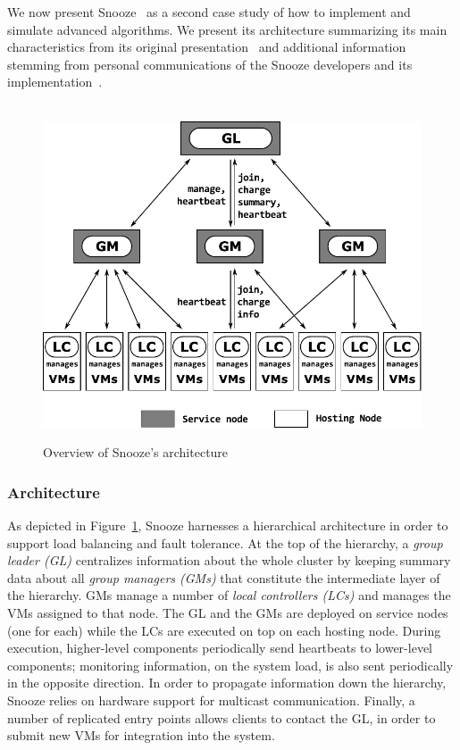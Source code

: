 We now present Snooze~\cite{feller:ccgrid12} as a second case study of how
to implement and simulate advanced algorithms.
We present its architecture summarizing its main
characteristics from its original presentation~\cite{feller:ccgrid12} and
additional information  stemming from personal communications of the Snooze
developers and its implementation~\cite{snoozeweb,snoozedev14}.
\begin{figure}
  {\centering ~\includegraphics[width=.95\linewidth]{figures/snoozearch.pdf}}
  \caption{Overview of Snooze's architecture}
  \label{fig:snoozearch}
\end{figure}

\subsubsection{Architecture}

As depicted in  Figure~\ref{fig:snoozearch}, Snooze harnesses a hierarchical architecture in order to support load
balancing and fault tolerance. At the
top of the hierarchy, a \emph{group leader (GL)} centralizes information about the
whole cluster by keeping summary data about all \emph{group
  managers (GMs)} that constitute the intermediate layer of the
hierarchy. GMs manage a
number of \emph{local controllers (LCs)} and manages the VMs assigned
to that node.
The GL and the GMs are deployed on service nodes (one for each) while
the LCs are executed on top on each hosting node.
During execution, higher-level components periodically send heartbeats to lower-level
components; monitoring information, \eg on the system load, is also
sent periodically in the opposite direction. In order to propagate
information down the hierarchy, Snooze relies on hardware support for
multicast communication. Finally, a number of replicated entry points
allows clients to contact the GL, \eg in order to submit new VMs for
integration into the system.

